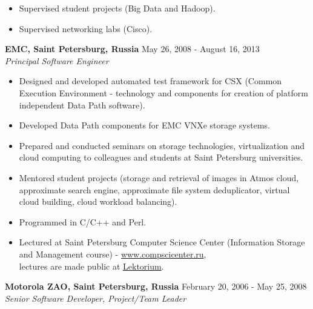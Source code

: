 \documentclass[a4paper,12pt,]{article}
\begin{document}
\begin{description}
\begin{itemize}
    \item Supervised student projects (Big Data and Hadoop).

    \item Supervised networking labs (Cisco).

    \end{itemize}

  \item{\bfseries EMC, Saint Petersburg, Russia} \hfill  May 26, 2008 - August 16, 2013 \\
    {\em Principal Software Engineer}  

    \begin{itemize}

    \item Designed and developed automated test framework for CSX (Common Execution Environment - technology and components for creation of platform independent Data Path software). 

    \item Developed Data Path components for EMC VNXe storage systems.

    \item Prepared and conducted seminars on storage technologies, virtualization and cloud computing to colleagues and students at Saint Petersburg universities. 

    \item Mentored student projects (storage and retrieval of images in Atmos cloud, approximate search engine, approximate file system deduplicator, virtual cloud building, cloud workload balancing).

    \item Programmed in C/C++ and Perl.

    \item Lectured at Saint Petersburg Computer Science Center (Information Storage and Management course) - \url{www.compscicenter.ru}, \\
	    lectures are made public at \href{http://www.lektorium.tv/course/?id=22928}{Lektorium}.

    \end{itemize}

  \item{\bfseries Motorola ZAO, Saint Petersburg, Russia} \hfill February 20, 2006 - May 25, 2008 \\
    {\em Senior Software Developer, Project/Team Leader}  

    \begin{itemize}


\end{itemize}
\end{description}
\end{document}
